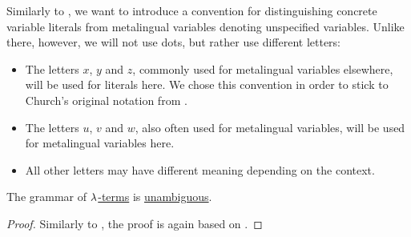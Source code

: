 \begin{remark}\label{rem:lambda_object_language}
  Similarly to , we want to introduce a convention for distinguishing concrete variable literals from metalingual variables denoting unspecified variables. Unlike there, however, we will not use dots, but rather use different letters:
  \begin{itemize}
    \item The letters \( x \), \( y \) and \( z \), commonly used for metalingual variables elsewhere, will be used for literals here. We chose this convention in order to stick to Church's original notation from \cite[352]{Church1932}.
    \item The letters \( u \), \( v \) and \( w \), also often used for metalingual variables, will be used for metalingual variables here.
    \item All other letters may have different meaning depending on the context.
  \end{itemize}
\end{remark}

\begin{proposition}\label{thm:lambda_terms_are_unambiguous}
  The grammar of \hyperref[def:untyped_lambda_term]{\( \mathrm{\lambda} \)-terms} is \hyperref[def:grammar_ambiguity]{unambiguous}.
\end{proposition}
\begin{proof}
  Similarly to , the proof is again based on .
\end{proof}

